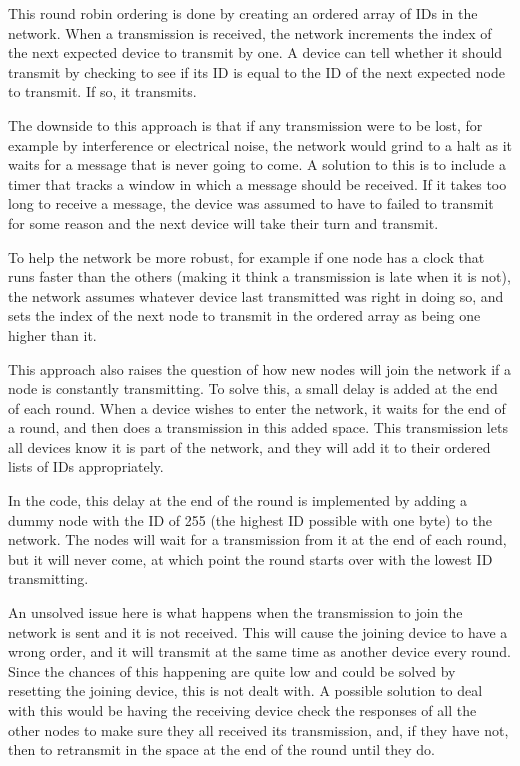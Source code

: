 This round robin ordering is done by creating an ordered array of IDs in the network. When a transmission is received, the network increments the index of the next expected device to transmit by one. A device can tell whether it should transmit by checking to see if its ID is equal to the ID of the next expected node to transmit. If so, it transmits. 

The downside to this approach is that if any transmission were to be lost, for example by interference or electrical noise, the network would grind to a halt as it waits for a message that is never going to come. A solution to this is to include a timer that tracks a window in which a message should be received. If it takes too long to receive a message, the device was assumed to have to failed to transmit for some reason and the next device will take their turn and transmit.

To help the network be more robust, for example if one node has a clock that runs faster than the others (making it think a transmission is late when it is not), the network assumes whatever device last transmitted was right in doing so, and sets the index of the next node to transmit in the ordered array as being one higher than it.

This approach also raises the question of how new nodes will join the network if a node is constantly transmitting. To solve this, a small delay is added at the end of each round. When a device wishes to enter the network, it waits for the end of a round, and then does a transmission in this added space. This transmission lets all devices know it is part of the network, and they will add it to their ordered lists of IDs appropriately. 

In the code, this delay at the end of the round is implemented by adding a dummy node with the ID of 255 (the highest ID possible with one byte) to the network. The nodes will wait for a transmission from it at the end of each round, but it will never come, at which point the round starts over with the lowest ID transmitting.

An unsolved issue here is what happens when the transmission to join the network is sent and it is not received. This will cause the joining device to have a wrong order, and it will transmit at the same time as another device every round. Since the chances of this happening are quite low and could be solved by resetting the joining device, this is not dealt with. A possible solution to deal with this would be having the receiving device check the responses of all the other nodes to make sure they all received its transmission, and, if they have not, then to retransmit in the space at the end of the round until they do.

